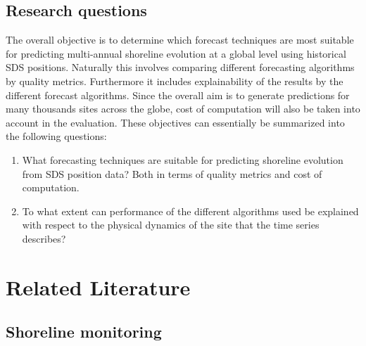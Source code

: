 \documentclass[format=sigconf, review=false, screen=true]{acmart}
\begin{document}







\subsection{Research questions}

The overall objective is to determine which forecast techniques are most suitable for predicting multi-annual shoreline evolution at a global level using historical SDS positions. Naturally this involves comparing different forecasting algorithms by quality metrics. Furthermore it includes explainability of the results by the different forecast algorithms. Since the overall aim is to generate predictions for many thousands sites across the globe, cost of computation will also be taken into account in the evaluation. These objectives can essentially be summarized into the following questions: 

\begin{enumerate}
	\item What forecasting techniques are suitable for predicting shoreline evolution from SDS position data? Both in terms of quality metrics and cost of computation. 

	\item To what extent can performance of the different algorithms used be explained with respect to the physical dynamics of the site that the time series describes? 

\end{enumerate}


\section{Related Literature} 

\subsection{Shoreline monitoring}
\end{document}
